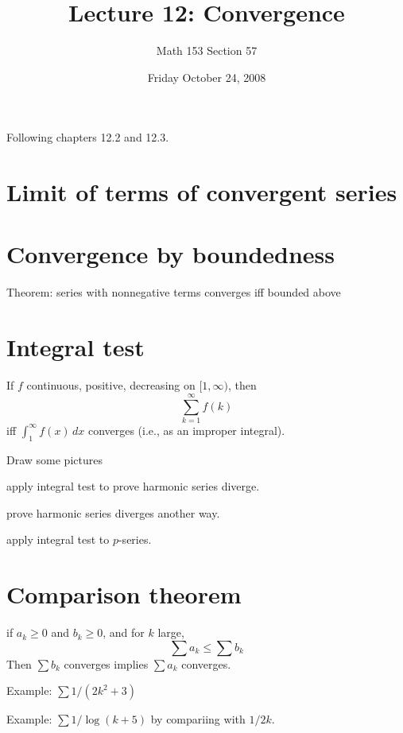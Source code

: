 \documentclass[12pt]{article}
\title{Lecture 12: Convergence}
\author{Math 153 Section 57}
\date{Friday October 24, 2008}
\begin{document}
\maketitle

Following chapters 12.2 and 12.3.

\section*{Limit of terms of convergent series}

\section*{Convergence by boundedness}

Theorem: series with nonnegative terms converges iff bounded above

\section*{Integral test}

If $f$ continuous, positive, decreasing on $[1,\infty)$, then
$$
\sum_{k=1}^\infty f(k)
$$
iff $\int_1^\infty f(x) \, dx$ converges (i.e., as an improper integral).

Draw some pictures

apply integral test to prove harmonic series diverge.

prove harmonic series diverges another way.

apply integral test to $p$-series.

\section*{Comparison theorem}

if $a_k \geq 0$ and $b_k \geq 0$, and for $k$ large,
$$
\sum a_k \leq \sum b_k
$$
Then $\sum b_k$ converges implies $\sum a_k$ converges.

Example: $\sum 1/(2k^2 + 3)$

Example: $\sum 1/\log (k+5)$ by compariing with $1/2k$.
\end{document}
